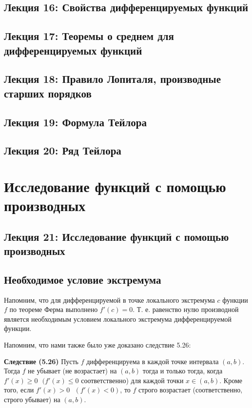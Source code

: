 	\section*{Лекция 16: Свойства дифференцируемых функций}
	
	\section*{Лекция 17: Теоремы о среднем для дифференцируемых функций}
	
	\section*{Лекция 18: Правило Лопиталя, производные старших порядков}
	
	\section*{Лекция 19: Формула Тейлора}
	
	\section*{Лекция 20: Ряд Тейлора}
	
	\chapter{Исследование функций с помощью производных}
	
	\section*{Лекция 21: Исследование функций с помощью производных}
	
	\section{Необходимое условие экстремума}
	
	Напомним, что для дифференцируемой в точке локального экстремума $c$ функции $f$ по теореме Ферма выполнено $f'(c) = 0$. Т. е. равенство нулю производной является необходимым условием локального экстремума дифференцируемой функции. 
	
	Напомним, что нами также было уже доказано следствие 5.26:
	
	\textbf{Следствие (5.26)} Пусть $f$ дифференцируема в каждой точке интервала $(a, b)$. Тогда $f$ не
	убывает (не возрастает) на $(a, b)$ тогда и только тогда, когда $f'(x) \geqslant 0 \text{ } (f'(x) \leqslant 0$ соответственно) для каждой точки $x \in (a, b)$. Кроме того, если $f'(x) > 0 \text{ } (f'(x) < 0)$, то $f$ строго возрастает (соответственно, строго убывает) на $(a, b)$.
	
